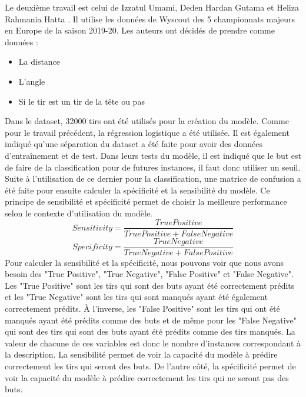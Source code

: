\documentclass[12pt]{article}
\begin{document}
Le deuxième travail est celui de Izzatul Umami, Deden Hardan Gutama et Heliza Rahmania Hatta \cite{umamiImplementingExpectedGoal2021}. 
Il utilise les données de Wyscout des 5 championnats majeurs en Europe de la saison 2019-20. 
Les auteurs ont décidés de prendre comme données :
\begin{itemize}
    \item La distance
    \item L'angle
    \item Si le tir est un tir de la tête ou pas
\end{itemize}
Dans le dataset, 32000 tirs ont été utilisés pour la création du modèle.
Comme pour le travail précédent, la régression logistique a été utilisée.
Il est également indiqué qu'une séparation du dataset a été faite pour avoir des données d'entraînement et de test.
Dans leurs tests du modèle, il est indiqué que le but est de faire de la classification pour de futures instances, il faut donc utiliser un seuil.
Suite à l'utilisation de ce dernier pour la classification, une matrice de confusion a été faite pour ensuite calculer la spécificité et la sensibilité du modèle.
Ce principe de sensibilité et spécificité permet de choisir la meilleure performance selon le contexte d'utilisation du modèle.
\begin{equation}
    Sensitivity = \frac{True Positive}{True Positive + False Negative}
\end{equation}
\begin{equation}
    Specificity = \frac{True Negative}{True Negative + False Positive}
\end{equation}
Pour calculer la sensibilité et la spécificité, nous pouvons voir que nous avons besoin des "True Positive", "True Negative", "False Positive" et "False Negative".
Les "True Positive" sont les tirs qui sont des buts ayant été correctement prédits et les "True Negative" sont les tirs qui sont manqués ayant été également correctement prédits.
À l'inverse, les "False Positive" sont les tirs qui ont été manqués ayant été prédits comme des buts et de même pour les "False Negative" qui sont des tirs qui sont des buts ayant été prédits comme des tirs manqués.
La valeur de chacune de ces variables est donc le nombre d'instances correspondant à la description.
\newline \newline
La sensibilité permet de voir la capacité du modèle à prédire correctement les tirs qui seront des buts.
De l'autre côté, la spécificité permet de voir la capacité du modèle à prédire correctement les tirs qui ne seront pas des buts.
\end{document}
